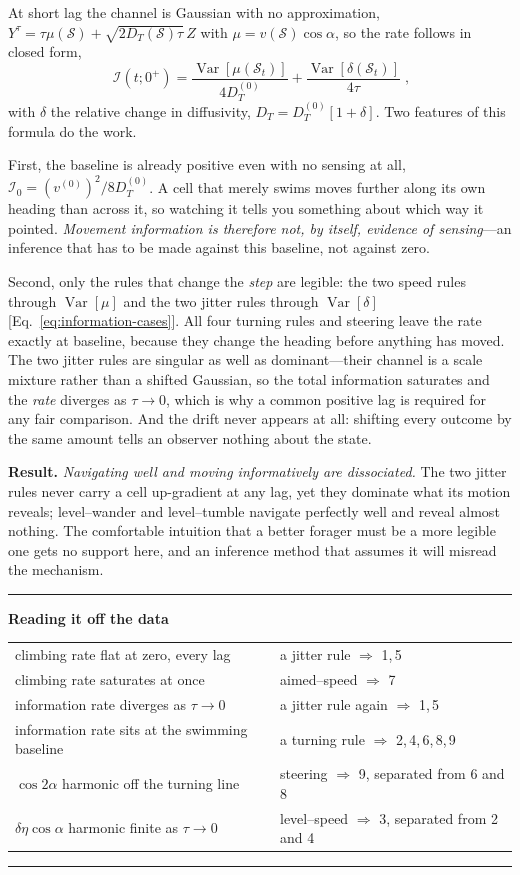 \documentclass[
  reprint,
  superscriptaddress,
  amsmath,
  amssymb,
  aps,
  pre,
  nofootinbib,
  floatfix
]{revtex4-2}
\makeatletter
\newcommand{\Irate}{\mathcal I}
\DeclareMathOperator{\Var}{Var}
\newenvironment{readout}
  {\par\addvspace{1.2ex}\noindent\rule{\columnwidth}{0.6pt}\par\nobreak
   \vspace{0.3ex}\noindent\textbf{Reading it off the data}\par\nobreak
   \vspace{0.4ex}\footnotesize\noindent
   \setlength{\parindent}{0pt}%
   \setlength{\emergencystretch}{3em}%
   \let\readout@restore\@arrayparboxrestore
   \def\@arrayparboxrestore{\readout@restore\raggedright\let\\\tabularnewline}%
   \begin{tabular}{@{}p{0.42\columnwidth}@{\hspace{0.9em}}p{0.50\columnwidth}@{}}}
  {\end{tabular}\par\nobreak\vspace{0.4ex}%
   \noindent\rule{\columnwidth}{0.6pt}\par\addvspace{1.0ex}}
\makeatother
\begin{document}
At short lag the channel is Gaussian with no approximation,
$Y^\tau=\tau\mu(\mathcal S)+\sqrt{2D_T(\mathcal S)\tau}\,Z$ with
$\mu=v(\mathcal S)\cos\alpha$, so the rate follows in closed form,
\begin{equation}
 \boxed{\;\Irate(t;0^{+})=\frac{\Var[\mu(\mathcal S_t)]}{4D_T^{(0)}}
 +\frac{\Var[\delta(\mathcal S_t)]}{4\tau}\;},
 \label{eq:short-lag-information}
\end{equation}
with $\delta$ the relative change in diffusivity,
$D_T=D_T^{(0)}[1+\delta]$.  Two features of this formula do the work.

First, the baseline is already positive even with no sensing at all,
$\Irate_0=(v^{(0)})^{2}/8D_T^{(0)}$.  A cell that merely swims moves further
along its own heading than across it, so watching it tells you something about
which way it pointed.  \emph{Movement information is therefore not, by itself,
evidence of sensing}---an inference that has to be made against this baseline,
not against zero.

Second, only the rules that change the \emph{step} are legible: the two speed
rules through $\Var[\mu]$ and the two jitter rules through $\Var[\delta]$
[Eq.~\eqref{eq:information-cases}].  All four turning rules and steering leave
the rate exactly at baseline, because they change the heading before anything
has moved.  The two jitter rules are singular as well as dominant---their
channel is a scale mixture rather than a shifted Gaussian, so the total
information saturates and the \emph{rate} diverges as $\tau\to0$, which is why
a common positive lag is required for any fair comparison.  And the drift
never appears at all: shifting every outcome by the same amount tells an
observer nothing about the state.

\textbf{Result.}  \emph{Navigating well and moving informatively are
dissociated.}  The two jitter rules never carry a cell up-gradient at any lag,
yet they dominate what its motion reveals; level--wander and level--tumble
navigate perfectly well and reveal almost nothing.  The comfortable intuition
that a better forager must be a more legible one gets no support here, and an
inference method that assumes it will misread the mechanism.

\begin{readout}
climbing rate flat at zero, every lag & a jitter rule $\Rightarrow$
1,\,5\\[2pt]
climbing rate saturates at once & aimed--speed $\Rightarrow$ 7\\[2pt]
information rate diverges as $\tau\to0$ & a jitter rule again $\Rightarrow$
1,\,5\\[2pt]
information rate sits at the swimming baseline & a turning rule $\Rightarrow$
2,\,4,\,6,\,8,\,9\\[2pt]
$\cos2\alpha$ harmonic off the turning line & steering $\Rightarrow$ 9,
separated from 6 and 8\\[2pt]
$\delta\eta\cos\alpha$ harmonic finite as $\tau\to0$ & level--speed
$\Rightarrow$ 3, separated from 2 and 4\\
\end{readout}
\end{document}
